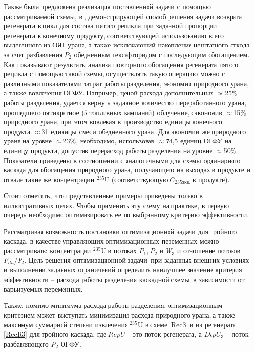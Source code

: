 Также была предложена реализация поставленной задачи с помощью рассматриваемой схемы, в \cite{gusevMultycascadeEnrichmentSchemes2020}, демонстрирующей споcоб решения задачи возврата регенерата в цикл для состава пятого рецикла при заданной пропорции регенерата к конечному продукту, соответствующей использованию всего выделенного из ОЯТ урана, а также исключающий накопление нештатного отхода за счет разбавления $P_2$ обедненным гексафторидом с последующим обогащением. Как показывают результаты анализа повторного обогащения регенерата пятого рецикла с помощью такой схемы, осуществлять такую операцию можно с различными показателями затрат работы разделения, экономии природного урана, а также вовлечения ОГФУ. Например, ценой расхода дополнительных $\approx$25\% работы разделения, удается вернуть заданное количество переработанного урана, прошедшего пятикратное (5 топливных кампаний) облучение, сэкономив $\approx$15\% природного урана, при этом вовлекая в производство единицы конечного продукта $\approx$31 единицы смеси обедненного урана. Для экономии же природного урана на уровне $\approx$23\%, необходимо, использовав $\approx$74,5 единиц ОГФУ на единицу продукта, допустив перерасход работы разделения на уровне $\approx$50\%. Показатели приведены в соотношении с аналогичными для схемы ординарного каскада для обогащения природного урана, получающего на выходах в продукте и отвале такие же концентрации $^{235}$U (соответствующую $C_{235 экв.}$ в продукте).


Стоит отметить, что представленные примеры приведены только в иллюстративных целях. Чтобы применить эту схему на практике, в первую очередь необходимо оптимизировать ее по выбранному критерию эффективности.

Рассматривая возможность постановки оптимизационной задачи для тройного каскада, в качестве управляющих оптимизационных переменных можно рассматривать: концентрации $^{235}$U в потоках $P_1$, $P_2$ и $W_3$ и отношение потоков $F_{du}$/$P_2$.
Цель решения оптимизационной задачи: при заданных внешних условиях и выполнении заданных ограничений определить наилучшее значение критерия эффективности -- расхода работы разделения каскадной схемы, в зависимости от варьируемых переменных.

Также, помимо минимума расхода работы разделения, оптимизационным критерием может выступать минимизация расхода природного урана, а также максимум суммарной степени извлечения $^{235}$U в схеме \ref{Rec3} и из регенерата \ref{RecR3} для тройного каскада, где $RepU$ -- это поток регенерата, а $DepU_{3}$ -- поток разбавляющего $P_2$ ОГФУ.



